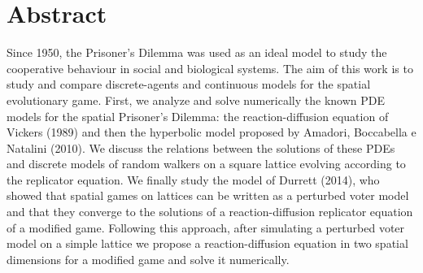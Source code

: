 %
\SkipTocEntry

\section*{Abstract}

Since 1950, the Prisoner's Dilemma was used as an ideal model to study
the cooperative behaviour in social and biological systems. The aim
of this work is to study and compare discrete-agents and continuous
models for the spatial evolutionary game. First, we analyze and solve
numerically the known PDE models for the spatial Prisoner's Dilemma:
the reaction-diffusion equation of Vickers (1989) and then the hyperbolic
model proposed by Amadori, Boccabella e Natalini (2010). We discuss
the relations between the solutions of these PDEs and discrete models
of random walkers on a square lattice evolving according to the replicator
equation. We finally study the model of Durrett (2014), who showed
that spatial games on lattices can be written as a perturbed voter
model and that they converge to the solutions of a reaction-diffusion
replicator equation of a modified game. Following this approach, after
simulating a perturbed voter model on a simple lattice we propose
a reaction-diffusion equation in two spatial dimensions for a modified
game and solve it numerically.%


